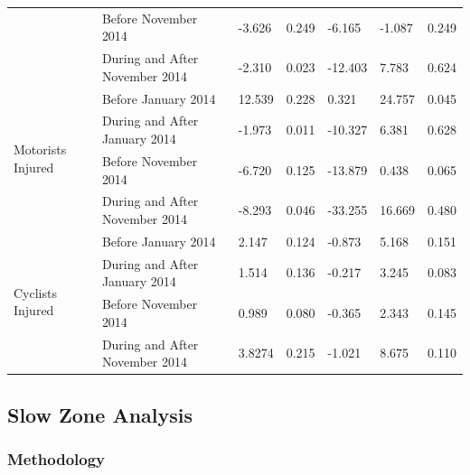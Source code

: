 \documentclass[10pt,journal,compsoc]{IEEEtran}
\begin{document}
\begin{table}[]
\begin{tabular}{|l|l|l|l|l|l|l|}
                                     & Before November 2014 & -3.626      & 0.249 & -6.165                 & -1.087               & 0.249   \\ \cline{2-7} 
                                     & During and After November 2014  & -2.310      & 0.023 & -12.403                & 7.783                & 0.624   \\ \hline
\multirow{4}{*}{Motorists Injured}   & Before January 2014 & 12.539      & 0.228 & 0.321                  & 24.757               & 0.045   \\ \cline{2-7} 
                                     & During and After January 2014  & -1.973      & 0.011 & -10.327                & 6.381                & 0.628   \\ \cline{2-7} 
                                     & Before November 2014 & -6.720      & 0.125 & -13.879                & 0.438                & 0.065   \\ \cline{2-7} 
                                     & During and After November 2014  & -8.293      & 0.046 & -33.255                & 16.669               & 0.480   \\ \hline
\multirow{4}{*}{Cyclists Injured}    & Before January 2014 & 2.147       & 0.124 & -0.873                 & 5.168                & 0.151   \\ \cline{2-7} 
                                     & During and After January 2014  & 1.514       & 0.136 & -0.217                 & 3.245                & 0.083   \\ \cline{2-7} 
                                     & Before November 2014 & 0.989       & 0.080 & -0.365                 & 2.343                & 0.145   \\ \cline{2-7} 
                                     & During and After November 2014  & 3.8274      & 0.215 & -1.021                 & 8.675                & 0.110   \\ \hline
\end{tabular}
\end{table}

\subsection{Slow Zone Analysis}

\subsubsection{Methodology}
\end{document}
